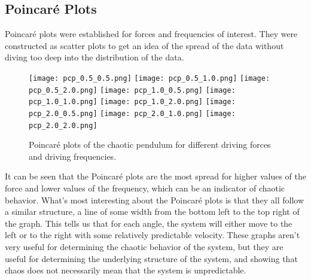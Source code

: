 \documentclass[11pt]{article} %
\begin{document}
    \subsection{Poincar\'e Plots}
    Poincar\'e plots were established for forces and frequencies of interest. They were constructed as scatter plots to get an idea of the spread
    of the data without diving too deep into the distribution of the data.
    \begin{figure}[H]
        \centering
        \texttt{[image: pcp\_0.5\_0.5.png]}
        \texttt{[image: pcp\_0.5\_1.0.png]}
        \texttt{[image: pcp\_0.5\_2.0.png]}
        \texttt{[image: pcp\_1.0\_0.5.png]}
        \texttt{[image: pcp\_1.0\_1.0.png]}
        \texttt{[image: pcp\_1.0\_2.0.png]}
        \texttt{[image: pcp\_2.0\_0.5.png]}
        \texttt{[image: pcp\_2.0\_1.0.png]}
        \texttt{[image: pcp\_2.0\_2.0.png]}
        \caption{Poincar\'e plots of the chaotic pendulum for different driving forces and driving frequencies.}
    \end{figure}
    It can be seen that the Poincar\'e plots are the most spread for higher values of the force and lower values of the frequency, which can be
    an indicator of chaotic behavior. What's most interesting about the Poincar\'e plots is that they all follow a similar structure, a line of
    some width from the bottom left to the top right of the graph. This tells us that for each angle, the system will either move to the left or
    to the right with some relatively predictable velocity. These graphs aren't very useful for determining the chaotic behavior of the system,
    but they are useful for determining the underlying structure of the system, and showing that chaos does not necessarily mean that the system
    is unpredictable.\\
\end{document}
